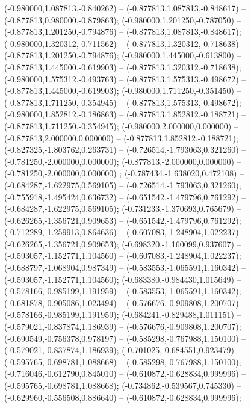  (-0.980000,1.087813,-0.840262) -- (-0.877813,1.087813,-0.848617) -- (-0.877813,0.980000,-0.879863);
 (-0.980000,1.201250,-0.787050) -- (-0.877813,1.201250,-0.794876) -- (-0.877813,1.087813,-0.848617);
 (-0.980000,1.320312,-0.711562) -- (-0.877813,1.320312,-0.718638) -- (-0.877813,1.201250,-0.794876);
 (-0.980000,1.445000,-0.613800) -- (-0.877813,1.445000,-0.619903) -- (-0.877813,1.320312,-0.718638);
 (-0.980000,1.575312,-0.493763) -- (-0.877813,1.575313,-0.498672) -- (-0.877813,1.445000,-0.619903);
 (-0.980000,1.711250,-0.351450) -- (-0.877813,1.711250,-0.354945) -- (-0.877813,1.575313,-0.498672);
 (-0.980000,1.852812,-0.186863) -- (-0.877813,1.852812,-0.188721) -- (-0.877813,1.711250,-0.354945);
 (-0.980000,2.000000,0.000000) -- (-0.877813,2.000000,0.000000) -- (-0.877813,1.852812,-0.188721);
 (-0.827325,-1.803762,0.263731) -- (-0.726514,-1.793063,0.321260) -- (-0.781250,-2.000000,0.000000);
 (-0.877813,-2.000000,0.000000) -- (-0.781250,-2.000000,0.000000) ;
 (-0.787434,-1.638020,0.472108) -- (-0.684287,-1.622975,0.569105) -- (-0.726514,-1.793063,0.321260);
 (-0.755918,-1.495424,0.636732) -- (-0.651542,-1.479796,0.761292) -- (-0.684287,-1.622975,0.569105);
 (-0.731233,-1.370693,0.765679) -- (-0.626265,-1.356721,0.909653) -- (-0.651542,-1.479796,0.761292);
 (-0.712289,-1.259913,0.864636) -- (-0.607083,-1.248904,1.022237) -- (-0.626265,-1.356721,0.909653);
 (-0.698320,-1.160099,0.937607) -- (-0.593057,-1.152771,1.104560) -- (-0.607083,-1.248904,1.022237);
 (-0.688797,-1.068904,0.987349) -- (-0.583553,-1.065591,1.160342) -- (-0.593057,-1.152771,1.104560);
 (-0.683380,-0.984430,1.015649) -- (-0.578166,-0.985199,1.191959) -- (-0.583553,-1.065591,1.160342);
 (-0.681878,-0.905086,1.023494) -- (-0.576676,-0.909808,1.200707) -- (-0.578166,-0.985199,1.191959);
 (-0.684241,-0.829488,1.011151) -- (-0.579021,-0.837874,1.186939) -- (-0.576676,-0.909808,1.200707);
 (-0.690549,-0.756378,0.978197) -- (-0.585298,-0.767988,1.150100) -- (-0.579021,-0.837874,1.186939);
 (-0.701025,-0.684551,0.923479) -- (-0.595765,-0.698781,1.088668) -- (-0.585298,-0.767988,1.150100);
 (-0.716046,-0.612790,0.845010) -- (-0.610872,-0.628834,0.999996) -- (-0.595765,-0.698781,1.088668);
 (-0.734862,-0.539567,0.745330) -- (-0.629960,-0.556508,0.886640) -- (-0.610872,-0.628834,0.999996);
